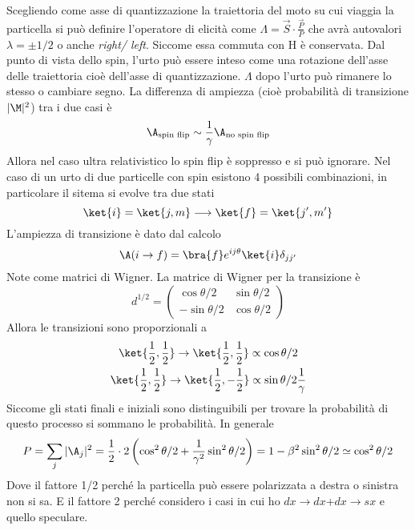 \documentclass[12pt]{book}
\begin{document}
\begin{itemize}
Scegliendo come asse di quantizzazione la traiettoria del moto su cui viaggia la particella si può definire l'operatore di elicità come $\Lambda = \vec S \cdot \frac{\vec P}{P}$ che avrà autovalori $\lambda = \pm 1/2$ o anche \emph{right/ left}. Siccome essa commuta con H è conservata. Dal punto di vista dello spin, l'urto può essere inteso come una rotazione dell'asse delle traiettoria cioè dell'asse di quantizzazione. $\Lambda$ dopo l'urto può rimanere lo stesso o cambiare segno. La differenza di ampiezza (cioè probabilità di transizione $|\M|^2$) tra i due casi è
\begin{gather}
	\A_{\text{spin flip}} \sim \frac{1}{\gamma} \A_{\text{no spin flip}}
\end{gather}
Allora nel caso ultra relativistico lo spin flip è soppresso e si può ignorare. Nel caso di un urto di due particelle con spin esistono 4 possibili combinazioni, in particolare il sitema si evolve tra due stati
\begin{equation}
	\ket{i} =\ket{j,m} \longrightarrow \ket{f}=\ket{j',m'}
\end{equation}
L'ampiezza di transizione è dato dal calcolo
\begin{equation}
	\A(i \rightarrow f) = \bra{f} e^{i j \theta} \ket{i} \delta_{j j'}
\end{equation}
Note come matrici di Wigner. La matrice di Wigner per la transizione è
\begin{equation}
	d^{1/2} = \left(\begin{matrix}
		\cos \theta/2 & \sin \theta/2 \\ - \sin \theta/2 & \cos \theta/2
	\end{matrix}\right)
\end{equation}
Allora le transizioni sono proporzionali a
\begin{gather}
\ket{\frac{1}{2}, \frac{1}{2}} \rightarrow \ket{ \frac{1}{2},\frac{1}{2}} \propto \cos \theta/2\\
\ket{\frac{1}{2},\frac{1}{2}} \rightarrow \ket{\frac{1}{2}, - \frac{1}{2}} \propto \sin \theta /2 \frac{1}{\gamma}	
\end{gather}
Siccome gli stati finali e iniziali sono distinguibili per trovare la probabilità di questo processo si sommano le probabilità. In generale
\begin{equation}
	P= \sum_j |\A_j|^2 = \frac{1}{2} \cdot 2 \left (\cos^2 \theta/2 + \frac{1}{\gamma^2} \sin^2 \theta/2 \right) = 1- \beta^2 \sin^2 \theta/2 \simeq \cos^2 \theta /2
\end{equation}
Dove il fattore 1/2 perché la particella può essere polarizzata a destra o sinistra non si sa. E il fattore 2 perché considero i casi in cui ho $dx \rightarrow dx $+$dx \rightarrow sx$ e quello speculare.


\end{itemize}
\end{document}
